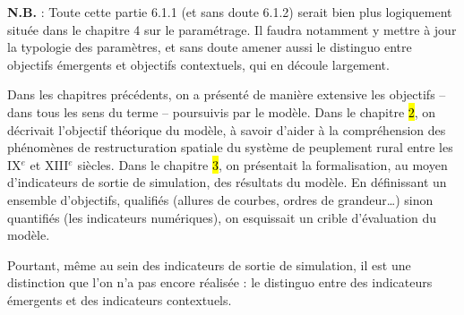 \begin{tcolorbox}[breakable,left=0pt,right=0pt,top=0pt,bottom=0pt,
	colback=yellow!50,colframe=black,width=\dimexpr\textwidth\relax, 
	enlarge left by=0mm, boxsep=5pt,arc=0pt,outer arc=0pt]
\textbf{N.B.} : Toute cette partie 6.1.1 (et sans doute 6.1.2) serait bien plus logiquement située dans le chapitre 4 sur le paramétrage.
Il faudra notamment y mettre à jour la typologie des paramètres, et sans doute amener aussi le distinguo entre objectifs émergents et objectifs contextuels, qui en découle largement.
\end{tcolorbox}

Dans les chapitres précédents, on a présenté de manière extensive les objectifs -- dans tous les sens du terme -- poursuivis par le modèle.
Dans le chapitre \hl{2}, on décrivait l'objectif théorique du modèle, à savoir d'aider à la compréhension des phénomènes de restructuration spatiale du système de peuplement rural entre les IX$^e$ et XIII$^e$ siècles.
Dans le chapitre \hl{3}, on présentait la formalisation, au moyen d'indicateurs de sortie de simulation, des résultats du modèle.
En définissant un ensemble d'objectifs, qualifiés (allures de courbes, ordres de grandeur\ldots) sinon quantifiés (les indicateurs numériques), on esquissait un crible d'évaluation du modèle.

Pourtant, même au sein des indicateurs de sortie de simulation, il est une distinction que l'on n’a pas encore réalisée : le distinguo entre des indicateurs \og émergents\fg{} et des indicateurs \og contextuels\fg{}.

